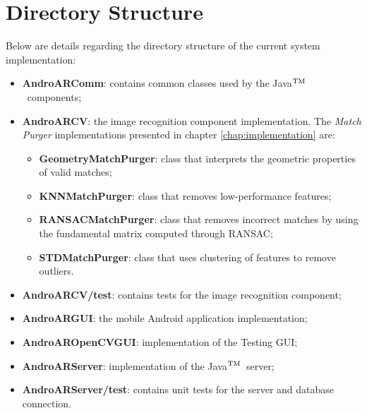 \documentclass[a4paper,onecolumn,oneside,titlepage,11pt]{report}
\def\tm{\leavevmode\hbox{$\rm {}^{TM}$}}
\begin{document}
\chapter{Directory Structure}
Below are details regarding the directory structure of the current system implementation:
\begin{itemize}
	\item \textbf{AndroARComm}: contains common classes used by the Java\tm\ components;
	\item \textbf{AndroARCV}: the image recognition component implementation. The \emph{Match Purger} implementations presented in chapter \ref{chap:implementation} are:
	\begin{itemize}
		\item \textbf{GeometryMatchPurger}: class that interprets the geometric properties of valid matches;
		\item \textbf{KNNMatchPurger}: class that removes low-performance features;
		\item \textbf{RANSACMatchPurger}: class that removes incorrect matches by using the fundamental matrix computed through RANSAC;
		\item \textbf{STDMatchPurger}: class that uses clustering of features to remove outliers. 
	\end{itemize}
	\item \textbf{AndroARCV/test}: contains tests for the image recognition component;
	\item \textbf{AndroARGUI}: the mobile Android application implementation;
	\item \textbf{AndroAROpenCVGUI}: implementation of the Testing GUI;
	\item \textbf{AndroARServer}: implementation of the Java\tm\ server;
	\item \textbf{AndroARServer/test}: contains unit tests for the server and database connection.
\end{itemize}
\end{document}
